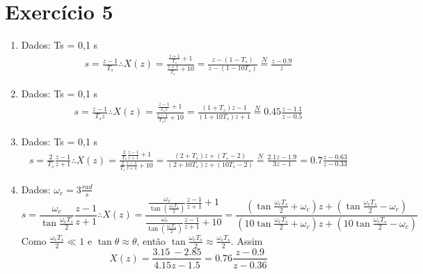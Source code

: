 \documentclass{article}
\begin{document}
\section*{Exercício 5}
\begin{enumerate}
\item %
Dados: Ts = 0,1 s
\begin{equation}
\begin{split}
s = \frac{z - 1}{T_s} \therefore X(z) = \frac{\frac{z+1}{T_s} + 1}{\frac{z+1}{T_s} + 10} = \frac{z - (1-T_s)}{z - (1-10T_s)} \stackrel{N}{=} \frac{z - 0.9}{z} 
\end{split}
\end{equation}
\item %
Dados: Ts = 0,1 s
\begin{equation}
\begin{split}
s = \frac{z - 1}{T_s z} \therefore X(z) = \frac{\frac{z-1}{T_s z} + 1}{\frac{z-1}{T_s z} + 10} = \frac{(1+T_s) z - 1}{(1 + 10T_s) z + 1} \stackrel{N}{=} 0.45 \frac{z - 1.1}{z - 0.5}
\end{split}
\end{equation}
\item %
Dados: Ts = 0,1 s
\begin{equation}
\begin{split}
s = \frac{2}{T_s} \frac{z - 1}{z+1} \therefore X(z) = \frac{\frac{2}{T_s} \frac{z-1}{z+1} + 1}{\frac{2}{T_s} \frac{z-1}{z+1} + 10} = \frac{(2+T_s)z + (T_s - 2)}{(2 + 10T_s) z + (10 T_s - 2)} \stackrel{N}{=} \frac{2.1z - 1.9}{3z - 1} = 0.7\frac{z-0.63}{z-0.33}
\end{split}
\end{equation}
\item %
Dados: $\omega_c = 3 \frac{rad}{s}$
\begin{equation}
s = \frac{\omega_c}{\tan{\frac{\omega_c T_s}{2}}} \frac{z-1}{z+1} \therefore X(z) = \frac{\frac{\omega_c}{\tan(\frac{\omega_c T_s}{2})} \frac{z-1}{z+1} + 1}{\frac{\omega_c}{\tan(\frac{\omega_c T_s}{2})} \frac{z-1}{z+1} + 10} = \frac{(\tan{\frac{\omega_c T_s}{2}} + \omega_c) z + (\tan{\frac{\omega_c T_s}{2}} - \omega_c)}{(10 \tan{\frac{\omega_c T_s}{2}} + \omega_c) z + (10 \tan{\frac{\omega_c T_s}{2}} - \omega_c)} 
\end{equation}
Como $\frac{\omega_c T_s}{2} \ll 1$ e $\tan{\theta} \approx \theta$, então $\tan{\frac{\omega_c T_s}{2}} \approx \frac{\omega_c T_s}{2}$. Assim
\begin{equation}
X(z) = \frac{3.15\ - 2.85}{4.15z - 1.5} = 0.76 \frac{z - 0.9}{z - 0.36}
\end{equation}

\end{enumerate}
\end{document}
